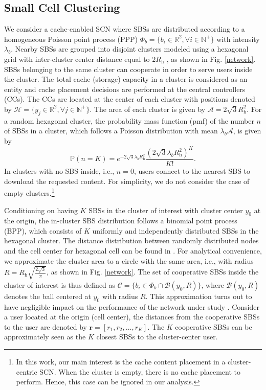 \documentclass[twocolumns,10pt]{IEEEtran}
\begin{document}
\subsection{Small Cell Clustering}
We consider a cache-enabled SCN where SBSs are distributed according to a homogeneous Poisson point process (PPP) $\Phi_b= \{b_i \in \mathbb{R}^2, \forall i\in \mathbb{N}^{+}\}$ with intensity $\lambda_b$. Nearby SBSs are grouped into disjoint clusters modeled using a hexagonal grid with inter-cluster center distance equal to $2R_{\text{h}}$ \cite{hexagonal}, as shown in Fig. \ref{network}. SBSs belonging to the same cluster can cooperate in order to serve users inside the cluster. The total cache (storage) capacity in a cluster is considered as an entity and cache placement decisions are performed at the central controllers (CCs). The CCs are located at the center of each cluster with positions denoted by $\mathcal{H}=\{y_j \in \mathbb{R}^2, \forall j\in \mathbb{N}^{+}\}$. The area of each cluster is given by $\mathcal{A}=2\sqrt{3}R_{\text{h}}^2$. 
For a random hexagonal cluster, the probability mass function (pmf) of the number $n$ of SBSs in a cluster, which follows a Poisson distribution with mean $\lambda_b\mathcal{A}$, is given by 
\begin{equation}
\mathbb{P}(n=K)=e^{-2\sqrt{3}\lambda_b R_{\text{h}}^2}  \frac{\left(2\sqrt{3}\lambda_b R_{\text{h}}^2\right)^{K}}{K !}.
\label{pmf}
\end{equation}
In clusters with no SBS inside, i.e., $n=0$, users connect to the nearest SBS to download the requested content. For simplicity, we do not consider the case of empty clusters.\footnote{In this work, our main interest is the cache content placement in a cluster-centric SCN. When the cluster is empty, there is no cache placement to perform. Hence, this case can be ignored in our analysis.}

Conditioning on having $K$ SBSs in the cluster of interest with cluster center $y_0$ at the origin, the in-cluster SBS distribution follows a binomial point process (BPP), which consists of $K$ uniformly and independently distributed SBSs in the hexagonal cluster. The distance distribution between randomly distributed nodes and the cell center for hexagonal cell can be found in \cite{hexagon_pdf}. For analytical convenience, we approximate the cluster area to a circle with the same area, i.e., with radius $R=R_{\text{h}}\sqrt{\frac{2 \sqrt{3}}{\pi}}$, as shown in Fig. \ref{network}. The set of cooperative SBSs inside the cluster of interest is thus defined as $\mathcal{C}=\{b_i \in \Phi_b \cap \mathcal{B}(y_0, R)\}$, where $\mathcal{B}(y_0, R)$ denotes the ball centered at $y_0$ with radius $R$. This approximation turns out to have negligible impact on the performance of the network under study \cite{hexagon_pdf}. Consider a user located at the origin (cell center), the distances from the cooperative SBSs to the user are denoted by $\mathbf{r}=[r_1, r_2, \ldots, r_K]$. The $K$ cooperative SBSs can be approximately seen as the $K$ closest SBSs to the cluster-center user.
\end{document}

